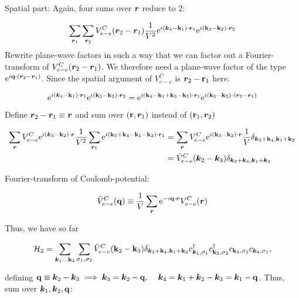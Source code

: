 \noindent Spatial part: Again, four sums over $\bm{r}$ reduce to 2: 

\begin{equation*}
	\sum_{\bm{r}_1} \sum_{\bm{r}_2} V_{e-e}^C (\bm{r}_2-\bm{r}_1) \frac{1}{V^2} \mathrm{e}^{i (\bm{k}_4-\vb{k}_1)\cdot \bm{r}_1} \mathrm{e}^{i (\vb{k}_3-\vb{k}_2)\cdot \bm{r}_2} 
\end{equation*}
\noindent Rewrite plane-wave factors in such a way that we can factor out a Fourier-transform of $V_{e-e}^C (\bm{r}_2-\bm{r}_1)$. We therefore need a plane-wave factor of the type $\mathrm{e}^{i \vb{q}\cdot (\bm{r}_2- \bm{r}_1)}$. Since the spatial argument of $V_{e-e}^C$ is $\bm{r}_2 -\vb{r}_1$ here.

\begin{equation*}
	\mathrm{e}^{i (\bm{k}_4-\vb{k}_1)\cdot \bm{r}_1} \mathrm{e}^{i (\vb{k}_3-\vb{k}_2)\cdot \bm{r}_2}  = \mathrm{e}^{i(\vb{k}_4-\vb{k}_1+ \vb{k}_3-\vb{k}_2)\cdot \bm{r}_1} \mathrm{e}^{i(\vb{k}_3- \vb{k}_2) \cdot (\bm{r}_2- \bm{r}_1)}
\end{equation*}

\noindent Define $\bm{r}_2 -\bm{r}_1 \equiv \bm{r}$ and sum over $(\vb{r}, \bm{r}_1)$ instead of $(\vb{r}_1, \bm{r}_2)$

\begin{align*}
	\sum_{\bm{r}} V_{e-e}^C \mathrm{e}^{i(\bm{k}_3-\vb{k}_2)\cdot \bm{r}} \frac{1}{V^2} \sum_{\bm{r}_1} \mathrm{e}^{i(\vb{k}_3+\vb{k}_4-\vb{k}_1-\vb{k}_2)\cdot \bm{r}_1} &=\sum_{\bm{r}} V_{e-e}^C \mathrm{e}^{i(\vb{k}_3-\vb{k}_2)\cdot \bm{r}}   \frac{1}{V} \delta_{\bm{k}_3+\vb{k}_4, \vb{k}_1+\vb{k}_2}\\
	&= \tilde{V}_{e-e}^C (\bm{k}_2-\bm{k}_3) \delta_{\bm{k}_3+\bm{k}_4, \bm{k}_1+\bm{k}_2}
\end{align*}

\noindent Fourier-transform of Coulomb-potential: 

\begin{align*}
	\tilde{V}_{e-e}^C (\vb{q})  \equiv \frac{1}{V} \sum_{\bm{r}} \mathrm{e}^{-i \vb{q} \cdot \bm{r} } V_{e-e}^C (\bm{r})
\end{align*}


\noindent Thus, we have so far

\begin{align*}
	\mathcal{H}_2 = \sum_{\bm{k}_1...\vb{k}_4 } \sum_{\sigma_1, \sigma_2} \tilde{V}_{e-e}^C (\vb{k}_2- \vb{k}_3) \delta_{\bm{k}_3+\vb{k}_4, \vb{k}_1+\vb{k}_2} c^{\dagger}_{ \bm{k}_1, \sigma_1} c^{\dagger}_{ \vb{k}_2, \sigma_2}  c_{ \vb{k}_3, \sigma_2} c_{ \bm{k}_4, \sigma_1},
\end{align*}

defining $\vb{q} \equiv \bm{k}_2- \bm{k}_3 \implies \bm{k}_3 =  \bm{k}_2-\vb{q}, \hspace{0.4cm} \bm{k}_4 = \bm{k}_1 + \bm{k}_2-\bm{k}_3 = \bm{k}_1- \vb{q}$.
Thus, sum over $\bm{k}_1, \bm{k}_2, \vb{q}$:

